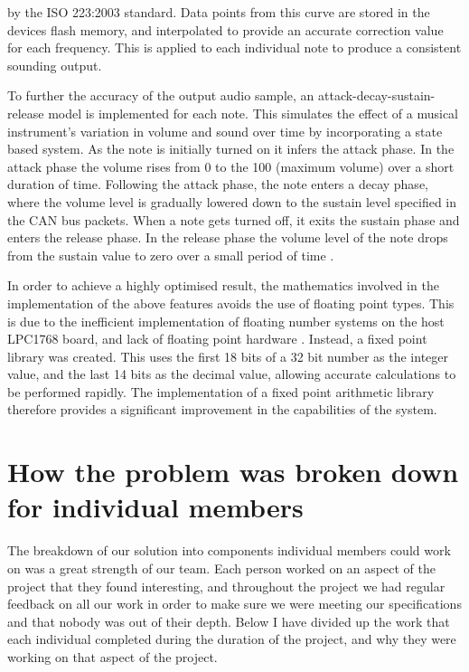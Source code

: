 by the ISO 223:2003 standard. %
Data points from this curve are stored in the devices flash memory, and 
interpolated to provide an accurate correction value for each frequency. This is 
applied to each individual note to produce a consistent sounding output. 
\par\bigskip\noindent
To further the accuracy of the output audio sample, an attack-decay-sustain-release 
model is implemented for each note. This simulates the effect of a musical 
instrument's variation in volume and sound over time by incorporating a state 
based system. As the note is initially turned on it infers the attack phase. 
In the attack phase the volume rises from 0 to the 100 (maximum volume) over a 
short duration of time.
Following the attack phase, the note enters a decay phase, where the volume level 
is gradually lowered down to the sustain level specified in the CAN bus packets. 
When a note gets turned off, it exits the sustain phase and enters the release phase. 
In the release phase the volume level of the note drops from the sustain value to 
zero over a small period of time \cite{asr-book}. 
\par\bigskip\noindent
In order to achieve a highly optimised result, the mathematics involved in the 
implementation of the above features avoids the use of floating point types. 
This is due to the inefficient implementation of floating number systems on the 
host LPC1768 board, and lack of floating point hardware 
\cite{kormanyos2013real, lpc1768-datasheet}.
Instead, a fixed point library was created. This uses the first 18 bits of a 
32 bit number as the integer value, and the last 14 bits as the decimal value, 
allowing accurate calculations to be performed rapidly. 
The implementation of a fixed point arithmetic library therefore provides a 
significant improvement in the capabilities of the system.  

\section{How the problem was broken down for individual members}

The breakdown of our solution into components individual members could work on 
was a great strength of our team. Each person worked on an aspect of the project 
that they found interesting, and throughout the project we had regular feedback 
on all our work in order to make sure we were meeting our specifications and 
that nobody was out of their depth. Below I have divided up the work that each 
individual completed during the duration of the project, and why they were 
working on that aspect of the project. 

